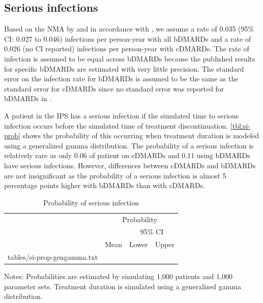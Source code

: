 \documentclass[11pt,final,fleqn]{article}\usepackage[]{graphicx}\usepackage[]{color}
\makeatletter
\theoremstyle{plain}
\newcommand*\ExpandableInput[1]{\@@input#1 }
\makeatother
\begin{document}
\subsection{Serious infections}
Based on the NMA by \citet{singh2011adverse} and in accordance with \citet{stevenson2016adalimumab}, we assume a rate of 0.035 (95\% CI: 0.027 to 0.046) infections per person-year with all bDMARDs and a rate of 0.026 (no CI reported) infections per person-year with cDMARDs. The rate of infection is assumed to be equal across bDMARDs because the published results for specific bDMARDs are estimated with very little precision. The standard error on the infection rate for bDMARDs is assumed to be the same as the standard error for cDMARDs since no standard error was reported for bDMARDs in \citet{singh2011adverse}.



A patient in the IPS has a serious infection if the simulated time to serious infection occurs before the simulated time of treatment discontinuation. \autoref{tbl:si-prob} shows the probability of this occurring when treatment duration is modeled using a generalized gamma distribution. The probability of a serious infection is relatively rare as only 0.06 of patient on cDMARDs and 0.11 using bDMARDs have serious infections. However, differences between cDMARDs and bDMARDs are not insignificant as the probability of a serious infection is almost 5 percentage points higher with bDMARDs than with cDMARDs.

\begin{table}[!ht]
\begin{center}
\begin{threeparttable}
\caption{Probability of serious infection} \label{tbl:si-prob}
\begin{tabularx}{\textwidth}{@{\extracolsep{\fill}}lrrr}
\hline
\multicolumn{1}{l}{} & \multicolumn{3}{c}{Probability} \\
\cmidrule{2-4} 
\multicolumn{2}{l}{} & \multicolumn{2}{c}{95\% CI} \\
\cmidrule{3-4} 
\multicolumn{1}{c}{} & \multicolumn{1}{c}{Mean} & \multicolumn{1}{c}{Lower} & \multicolumn{1}{c}{Upper} \\
\hline
\ExpandableInput{tables/si-prop-gengamma.txt}
\hline
\end{tabularx}
\scriptsize
Notes: Probabilities are estimated by simulating 1,000 patients and 1,000 parameter sets. Treatment duration is simulated using a generalized gamma distribution. 
\end{threeparttable}
\end{center}
\end{table}
\end{document}
